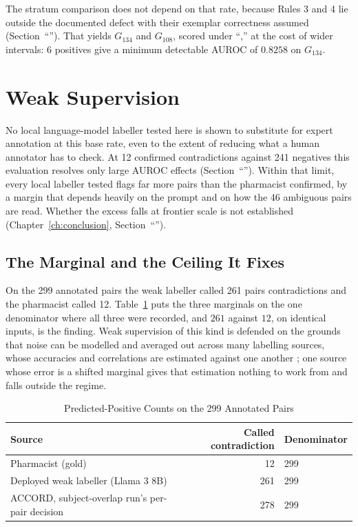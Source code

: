 The stratum comparison does not depend on that rate, because Rules 3 and 4 lie outside the
documented defect with their exemplar correctness assumed
(Section~``''). That yields $G_{134}$ and $G_{108}$, scored under
``,'' at the cost of wider intervals: 6 positives give a minimum
detectable AUROC of $0.8258$ on $G_{134}$.

\section{Weak Supervision}
\label{sec:res-rq2}

No local language-model labeller tested here is shown to substitute for expert
annotation at this base rate, even to the extent of reducing what a human
annotator has to check. At 12 confirmed contradictions against 241 negatives this evaluation resolves only large
AUROC effects (Section~``''). Within that limit, every local labeller
tested flags far more pairs than the pharmacist confirmed, by a margin that depends heavily
on the prompt and on how the 46 ambiguous pairs are read. Whether the excess falls at frontier scale is not established (Chapter~\ref{ch:conclusion},
Section~``'').

\subsection{The Marginal and the Ceiling It Fixes}

On the 299 annotated pairs the weak labeller called 261 pairs contradictions and
the pharmacist called 12. Table~\ref{tab:marginal} puts the three marginals on
the one denominator where all three were recorded, and $261$ against $12$, on identical inputs, is the finding. Weak supervision of this kind
is defended on the grounds that noise can be modelled and averaged out across many
labelling sources, whose accuracies and correlations are estimated against one
another \citep{ratner2017snorkel}; one source whose error is a shifted marginal
gives that estimation nothing to work from and falls outside the regime.

\begin{table}[!htbp]
\caption{Predicted-Positive Counts on the 299 Annotated Pairs}
\centering
\small
\begin{tabular}{lrl}
\toprule
\textbf{Source} & \textbf{Called contradiction} & \textbf{Denominator} \\
\midrule
Pharmacist (gold)                  & 12  & 299 \\
Deployed weak labeller (Llama 3 8B) & 261 & 299 \\
ACCORD, subject-overlap run's per-pair decision & 278 & 299 \\
\bottomrule
\end{tabular}
\label{tab:marginal}
\end{table}

